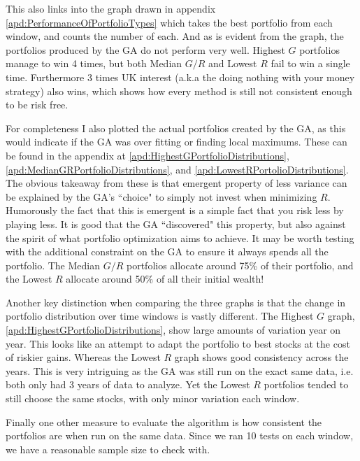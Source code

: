 \documentclass[11pt]{article}
\begin{document}
    This also links into the graph drawn in appendix \ref{apd:PerformanceOfPortfolioTypes}
    which takes the best portfolio from each window, and counts the number of each.
    And as is evident from the graph, the portfolios produced by the GA do not
    perform very well. Highest \(G\) portfolios manage to win 4 times, but both
    Median \(G/R\) and Lowest \(R\) fail to win a single time. Furthermore 3
    times UK interest (a.k.a the doing nothing with your money strategy)
    also wins, which shows how every method is still not consistent enough to
    be risk free.

    For completeness I also plotted the actual portfolios created by the GA, as this
    would indicate if the GA was over fitting or finding local maximums. These can
    be found in the appendix at \ref{apd:HighestGPortfolioDistributions},
    \ref{apd:MedianGRPortfolioDistributions}, and
    \ref{apd:LowestRPortolioDistributions}. The obvious takeaway from these is that
    emergent property of less variance can be explained by the GA's ``choice" to
    simply not invest when minimizing \(R\). Humorously the fact that this is emergent
    is a simple fact that you risk less by playing less. It is good that the GA
    ``discovered" this property, but also against the spirit of what portfolio
    optimization aims to achieve. It may be worth testing with the additional
    constraint on the GA to ensure it always spends all the portfolio. The Median
    \(G/R\) portfolios allocate around 75\% of their portfolio,
    and the Lowest \(R\) allocate around 50\% of all their initial wealth!

    Another key distinction when comparing the three graphs is that the change in
    portfolio distribution over time windows is vastly different. The Highest
    \(G\) graph, \ref{apd:HighestGPortfolioDistributions}, show large amounts
    of variation year on year. This looks like an attempt to adapt the portfolio
    to best stocks at the cost of riskier gains. Whereas the Lowest \(R\) graph
    shows good consistency across the years. This is very intriguing as the
    GA was still run on the exact same data, i.e. both only had 3 years of data to
    analyze. Yet the Lowest \(R\) portfolios tended to still choose the same stocks,
    with only minor variation each window.

    Finally one other measure to evaluate the algorithm is how consistent the portfolios
    are when run on the same data. Since we ran 10 tests on each window, we have a reasonable
    sample size to check with.
\end{document}

